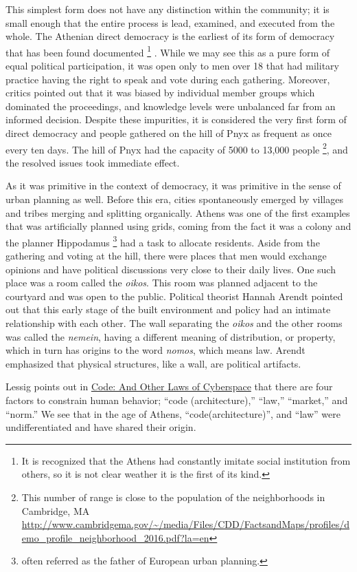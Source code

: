 This simplest form does not have any distinction within the community; it is small enough that the entire process is lead, examined, and executed from the whole.
The Athenian direct democracy is the earliest of its form of democracy that has been found documented \cite{ober2008democracy}
\footnote{It is recognized that the Athens had constantly imitate social institution from others, so it is not clear weather it is the first of its kind.}
. While we may see this as a pure form of equal political participation, it was open only to men over 18 that had military practice having the right to speak and vote during each gathering. Moreover, critics pointed out that it was biased by individual member groups which dominated the proceedings, and knowledge levels were unbalanced far from an informed decision. Despite these impurities, it is considered the very first form of direct democracy and people gathered on the hill of Pnyx as frequent as once every ten days. The hill of Pnyx had the capacity of 5000 to 13,000 people \footnote{This number of range is close to the population of the neighborhoods in Cambridge, MA \url{http://www.cambridgema.gov/~/media/Files/CDD/FactsandMaps/profiles/demo_profile_neighborhood_2016.pdf?la=en}}, and the resolved issues took immediate effect.

As it was primitive in the context of democracy, it was primitive in the sense
of urban planning as well. Before this era, cities spontaneously emerged by villages
and tribes merging and splitting organically. Athens was one of the first examples
that was artificially planned using grids,
coming from the fact it was a colony and the planner Hippodamus \footnote{often referred as the father of European urban planning.} had a task to allocate residents. Aside from the gathering and voting at the hill, there were places that men would exchange opinions and have political discussions very close to their daily lives. One such place was a room called the \textit{oikos}. This room was planned adjacent to the courtyard and was open to the public. Political theorist Hannah Arendt\cite{arendt2013human} pointed out that this early stage of the built environment and policy had an intimate relationship with each other. The wall separating the \textit{oikos} and the other rooms was called the \textit{nemein}, having a different meaning of distribution, or property, which in turn has origins to the word \textit{nomos}, which means law. Arendt emphasized that physical structures, like a wall, are political artifacts.

Lessig points out in \underline{Code: And Other Laws of Cyberspace} that there are four factors to constrain human behavior; ``code (architecture),'' ``law,'' ``market,'' and ``norm.'' \cite{lessig2009code} We see that in the age of Athens, ``code(architecture)'', and ``law'' were undifferentiated and have shared their origin.

